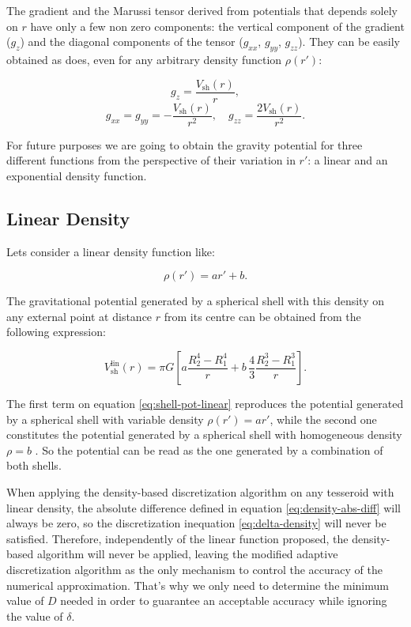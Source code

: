 \documentclass[extra]{gji}
\begin{document}
The gradient and the Marussi tensor derived from potentials that 
depends solely on $r$ have only a few non zero components: the vertical 
component of the gradient ($g_z$) and the diagonal components of the 
tensor ($g_{xx}$, $g_{yy}$, $g_{zz}$).
They can be easily obtained as \citet{Grombein2013} does, even for any 
arbitrary density function $\rho(r')$:

\begin{equation}
    g_z = \frac{V_\text{sh}(r)}{r},
\end{equation}
\begin{equation}
    g_{xx} = g_{yy} = -\frac{V_\text{sh}(r)}{r^2}, \quad
    g_{zz} = \frac{2V_\text{sh}(r)}{r^2}.
\end{equation}

For future purposes we are going to obtain the gravity potential for 
three different functions from the perspective of their variation in 
$r'$: a linear and an exponential density function.


\subsection{Linear Density}

Lets consider a linear density function like:

\begin{equation}
    \rho(r') = ar' + b.
\end{equation}

\noindent The gravitational potential generated by a spherical shell 
with this density on any external point at distance $r$ from its centre 
can be obtained from the following expression:

\begin{equation}
    V_\text{sh}^\text{lin}(r) = \pi G \left[ 
    a \frac{R_2^4 - R_1^4}{r} +
    b \,\frac{4}{3} \frac{R_2^3 - R_1^3}{r} \right].
    \label{eq:shell-pot-linear}
\end{equation}

\noindent The first term on equation \ref{eq:shell-pot-linear} 
reproduces the potential generated by a spherical shell with variable 
density $\rho(r') = ar'$, while the second one constitutes the 
potential generated by a spherical shell with homogeneous density $\rho 
= b$ \citep{Mikuska2006,Grombein2013}. So the potential can be read as 
the one generated by a combination of both shells.

When applying the density-based discretization algorithm on any 
tesseroid with linear density, the absolute difference defined in 
equation \ref{eq:density-abs-diff} will always be zero, so the 
discretization inequation \ref{eq:delta-density} will never be 
satisfied.
Therefore, independently of the linear function proposed, the 
density-based algorithm will never be applied, leaving the modified 
adaptive discretization algorithm as the only mechanism to control the 
accuracy of the numerical approximation.
That's why we only need to determine the minimum value of $D$ needed in 
order to guarantee an acceptable accuracy while ignoring the value of 
$\delta$.
\end{document}

